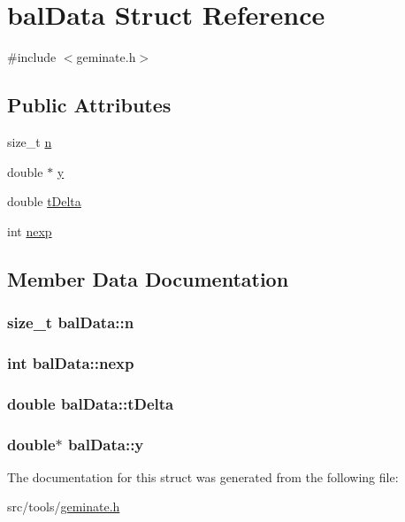 \hypertarget{structbalData}{\section{bal\-Data \-Struct \-Reference}
\label{structbalData}
}


{\ttfamily \#include $<$geminate.\-h$>$}

\subsection*{\-Public \-Attributes}
\begin{DoxyCompactItemize}
\item 
size\-\_\-t \hyperlink{structbalData_a638ec763ff9b3319e5b86f57162c1391}{n}
\item 
double $\ast$ \hyperlink{structbalData_a102c6fbb8708220f75a5d417c4069a2c}{y}
\item 
double \hyperlink{structbalData_a073eb557090770668e5f8bfda781676d}{t\-Delta}
\item 
int \hyperlink{structbalData_a49e94173ff3bcca6475762add560581e}{nexp}
\end{DoxyCompactItemize}


\subsection{\-Member \-Data \-Documentation}
\hypertarget{structbalData_a638ec763ff9b3319e5b86f57162c1391}{
\subsubsection[{n}]{\setlength{\rightskip}{0pt plus 5cm}size\-\_\-t {\bf bal\-Data\-::n}}}\label{structbalData_a638ec763ff9b3319e5b86f57162c1391}
\hypertarget{structbalData_a49e94173ff3bcca6475762add560581e}{
\subsubsection[{nexp}]{\setlength{\rightskip}{0pt plus 5cm}int {\bf bal\-Data\-::nexp}}}\label{structbalData_a49e94173ff3bcca6475762add560581e}
\hypertarget{structbalData_a073eb557090770668e5f8bfda781676d}{
\subsubsection[{t\-Delta}]{\setlength{\rightskip}{0pt plus 5cm}double {\bf bal\-Data\-::t\-Delta}}}\label{structbalData_a073eb557090770668e5f8bfda781676d}
\hypertarget{structbalData_a102c6fbb8708220f75a5d417c4069a2c}{
\subsubsection[{y}]{\setlength{\rightskip}{0pt plus 5cm}double$\ast$ {\bf bal\-Data\-::y}}}\label{structbalData_a102c6fbb8708220f75a5d417c4069a2c}


\-The documentation for this struct was generated from the following file\-:\begin{DoxyCompactItemize}
\item 
src/tools/\hyperlink{geminate_8h}{geminate.\-h}\end{DoxyCompactItemize}
